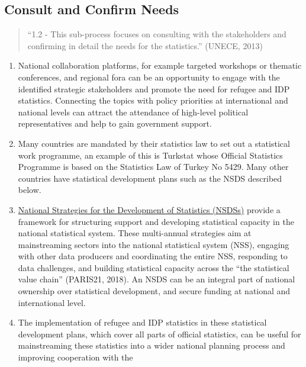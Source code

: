 \documentclass[
]{article}
\begin{document}
\hypertarget{consult-and-confirm-needs}{%
\subsection{Consult and Confirm Needs}\label{consult-and-confirm-needs}}

\begin{quote}
``1.2 - This sub-process focuses on consulting with the stakeholders
and confirming in detail the needs for the statistics.'' (UNECE, 2013)
\end{quote}

\begin{enumerate}
\def\labelenumi{\arabic{enumi}.}
\setcounter{enumi}{30}
\item
  National collaboration platforms, for example targeted workshops or
  thematic conferences, and regional fora can be an opportunity to
  engage with the identified strategic stakeholders and promote the
  need for refugee and IDP statistics. Connecting the topics with
  policy priorities at international and national levels can attract
  the attendance of high-level political representatives and help to
  gain government support.
\item
  Many countries are mandated by their statistics law to set out a
  statistical work programme, an example of this is Turkstat whose
  Official Statistics Programme is based on the Statistics Law of
  Turkey No 5429. Many other countries have statistical development
  plans such as the NSDS described below.
\item
  \href{https://nsdsguidelines.paris21.org/node/717}{National Strategies for the Development of Statistics
  (NSDSs)} provide a
  framework for structuring support and developing statistical
  capacity in the national statistical system. These multi-annual
  strategies aim at mainstreaming sectors into the national
  statistical system (NSS), engaging with other data producers and
  coordinating the entire NSS, responding to data challenges, and
  building statistical capacity across the ``the statistical value
  chain'' (PARIS21, 2018). An NSDS can be an integral part of national
  ownership over statistical development, and secure funding at
  national and international level.
\item
  The implementation of refugee and IDP statistics in these
  statistical development plans, which cover all parts of official
  statistics, can be useful for mainstreaming these statistics into a
  wider national planning process and improving cooperation with the

\end{enumerate}
\end{document}
